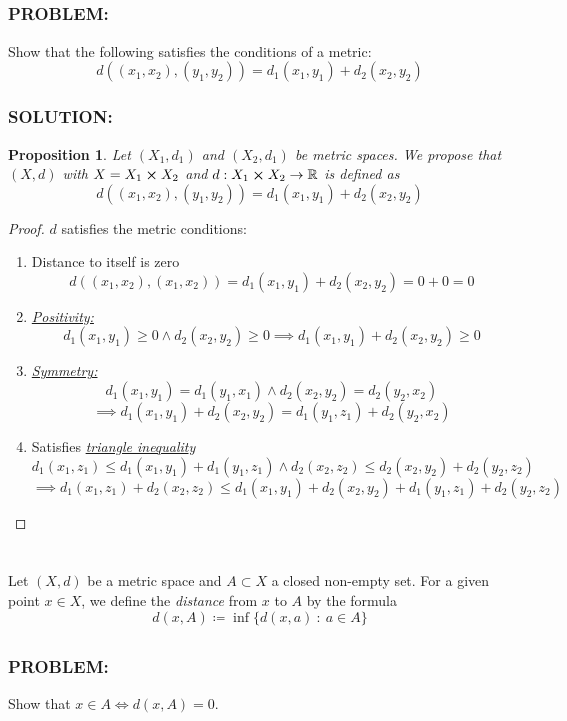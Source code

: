 \documentclass[]{article}
\newcommand{\Problem}{\subsubsection*{\textbf{PROBLEM:}}}
\newcommand{\Solution}{\subsubsection*{\textbf{SOLUTION:}}}
\newcommand{\R}{\mathbb{R}}
\newcommand{\st}{\ : \ }
\newtheorem{proposition}{Proposition}
\begin{document}
\newpage
\subsection{}
\Problem
Show that the following satisfies the conditions of a metric: \[
    d((x_1, x_2), (y_1, y_2)) = d_1(x_1,y_1) + d_2(x_2,y_2)
\]

\Solution
\begin{proposition}
    Let $(X_1,d_1)$ and $(X_2,d_1)$ be metric spaces.
    We propose that $(X, d)$ with $X = X_1 \cross X_2$ and $d :  X_1 \cross X_2 \to \R$ is defined as \[
        d((x_1, x_2), (y_1, y_2)) = d_1(x_1,y_1) + d_2(x_2,y_2)
    \]
\end{proposition}
\begin{proof}
    $d$ satisfies the metric conditions:
    \begin{enumerate}
        \item Distance to itself is zero \[
            d((x_1, x_2), (x_1, x_2)) = d_1(x_1,y_1) + d_2(x_2,y_2) = 0 + 0 = 0
        \] \item \emph{\underline{Positivity:}} \[
            d_1(x_1,y_1) \geq 0 \land d_2(x_2, y_2) \geq 0 \implies d_1(x_1,y_1) + d_2(x_2,y_2) \geq 0
        \]
         \item \emph{\underline{Symmetry:}} \[
            d_1(x_1,y_1) = d_1(y_1,x_1) \land d_2(x_2, y_2) = d_2(y_2,x_2)
        \]\[
            \implies d_1(x_1,y_1) + d_2(x_2,y_2) = d_1(y_1,z_1) + d_2(y_2,x_2)
        \] \item Satisfies \emph{\underline{triangle inequalit}y} \[
            d_1(x_1,z_1) \leq d_1(x_1,y_1) + d_1(y_1,z_1) \land d_2(x_2,z_2) \leq d_2(x_2,y_2) + d_2(y_2,z_2) 
        \]\[    
            \implies d_1(x_1,z_1) + d_2(x_2,z_2) \leq d_1(x_1,y_1) + d_2(x_2,y_2) + d_1(y_1,z_1) + d_2(y_2,z_2)
        \]
    \end{enumerate}
\end{proof}


\newpage
\section{}
Let $(X,d)$ be a metric space and $A \subset X$ a closed non-empty set.
For a given point $x\in X$, we define the \emph{distance} from $x$ to $A$ by the formula \[
    d(x,A) \coloneqq \inf\{d(x,a) \st a \in A\}
\]

\subsection{}
\Problem
Show that $x \in A \iff d(x,A) = 0$.
\end{document}
